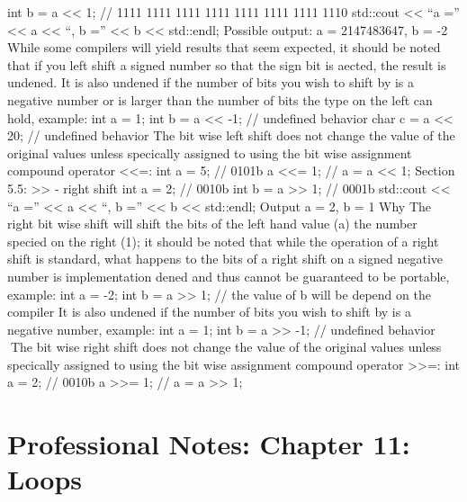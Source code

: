 int b = a \textless\textless{} 1; // 1111 1111 1111 1111 1111 1111 1111
1110 std::cout \textless\textless{} ``a ='' \textless\textless{} a
\textless\textless{} ``, b ='' \textless\textless{} b
\textless\textless{} std::endl; Possible output: a = 2147483647, b = -2
While some compilers will yield results that seem expected, it should be
noted that if you left shift a signed number so that the sign bit is
aected, the result is undened. It is also undened if the number of bits
you wish to shift by is a negative number or is larger than the number
of bits the type on the left can hold, example: int a = 1; int b = a
\textless\textless{} -1; // undefined behavior char c = a
\textless\textless{} 20; // undefined behavior The bit wise left shift
does not change the value of the original values unless specically
assigned to using the bit wise assignment compound operator
\textless\textless=: int a = 5; // 0101b a \textless\textless= 1; // a =
a \textless\textless{} 1; Section 5.5: \textgreater\textgreater{} -
right shift int a = 2; // 0010b int b = a \textgreater\textgreater{} 1;
// 0001b std::cout \textless\textless{} ``a ='' \textless\textless{} a
\textless\textless{} ``, b ='' \textless\textless{} b
\textless\textless{} std::endl; Output a = 2, b = 1 Why The right bit
wise shift will shift the bits of the left hand value (a) the number
specied on the right (1); it should be noted that while the operation of
a right shift is standard, what happens to the bits of a right shift on
a signed negative number is implementation dened and thus cannot be
guaranteed to be portable, example: int a = -2; int b = a
\textgreater\textgreater{} 1; // the value of b will be depend on the
compiler It is also undened if the number of bits you wish to shift by
is a negative number, example: int a = 1; int b = a
\textgreater\textgreater{} -1; // undefined behavior The bit wise right
shift does not change the value of the original values unless specically
assigned to using the bit wise assignment compound operator
\textgreater\textgreater=: int a = 2; // 0010b a
\textgreater\textgreater= 1; // a = a \textgreater\textgreater{} 1;

\hypertarget{professional-notes-chapter-11-loops}{%
\section{Professional Notes: Chapter 11:
Loops}\label{professional-notes-chapter-11-loops}}

